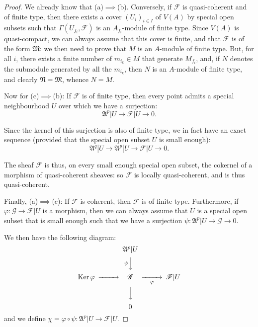 \documentclass[british]{article}
\newcommand{\oldpage}[1]{\marginpar{\footnotesize$\Big\vert$ \textit{p.~#1}}}
\begin{document}
\begin{proof}
We already know that (a)\(\implies\)(b). Conversely, if
\({\mathscr{F}}\) is quasi-coherent and of finite type, then there
exists a cover \((U_i)_{i\in I}\) of \(V(A)\) by special open subsets
such that \(\Gamma(U_{f_i},{\mathscr{F}})\) is an \(A_{f_i}\)-module of
finite type. Since \(V(A)\) is quasi-compact, we can always assume that
this cover is finite, and that \({\mathscr{F}}\) is of the form
\(\mathfrak{M}\): we then need to prove that \(M\) is an \(A\)-module of
finite type. But, for all \(i\), there exists a finite number of
\(m_{i_k}\in M\) that generate \(M_{f_i}\), and, if \(N\) denotes the
submodule generated by all the \(m_{i_k}\), then \(N\) is an
\(A\)-module of finite type, and clearly \(\mathfrak{N}=\mathfrak{M}\),
whence \(N=M\).

\bigskip

Now for (c)\(\implies\)(b): If \({\mathscr{F}}\) is of finite type, then
every point admits a special neighbourhood \(U\) over which we have a
surjection: \oldpage{1-10} \[
  \mathfrak{A}^p|U \to {\mathscr{F}}|U \to 0.
\]

Since the kernel of this surjection is also of finite type, we in fact
have an exact sequence (provided that the special open subset \(U\) is
small enough): \[
  \mathfrak{A}^q|U \to \mathfrak{A}^p|U \to {\mathscr{F}}|U \to 0.
\]

The sheaf \({\mathscr{F}}\) is thus, on every small enough special open
subset, the cokernel of a morphism of quasi-coherent sheaves: so
\({\mathscr{F}}\) is locally quasi-coherent, and is thus quasi-coherent.

\bigskip

Finally, (a)\(\implies\)(c): If \({\mathscr{F}}\) is coherent, then
\({\mathscr{F}}\) is of finite type. Furthermore, if
\(\varphi\colon{\mathscr{G}}\to{\mathscr{F}}|U\) is a morphism, then we
can always assume that \(U\) is a special open subset that is small
enough such that we have a surjection
\(\psi\colon\mathfrak{A}^p|U\to{\mathscr{G}}\to0\).

We then have the following diagram: \[
  \begin{CD}
    @. \mathfrak{A}^p|U @.
  \\@. @V{\psi}VV @.
  \\\operatorname{Ker}\varphi @>>> {\mathscr{G}} @>>{\varphi}> {\mathscr{F}}|U
  \\@. @VVV @.
  \\@. 0 @.
  \end{CD}
\] and we define
\(\chi=\varphi\circ\psi\colon\mathfrak{A}^p|U\to{\mathscr{F}}|U\).


\end{proof}
\end{document}
